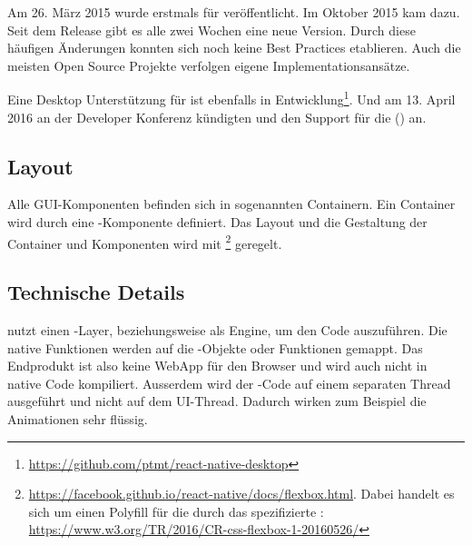Am 26. März 2015 wurde  erstmals für  veröffentlicht.
Im Oktober 2015 kam  dazu.\cite{react-native-release}
Seit dem Release gibt es alle zwei Wochen eine neue Version. 
Durch diese häufigen Änderungen konnten sich noch keine Best Practices etablieren. 
Auch die meisten Open Source Projekte verfolgen eigene Implementationsansätze.

Eine Desktop Unterstützung für  ist ebenfalls in Entwicklung\footnote{\url{https://github.com/ptmt/react-native-desktop}}. 
Und am 13. April 2016 an der  Developer Konferenz kündigten  und  den Support für die  () an.\cite{react-native-windows}


\subsection{Layout}
Alle \gls{GUI}-Komponenten befinden sich in sogenannten Containern. 
Ein Container wird durch eine -Komponente definiert. 
Das Layout und die Gestaltung der Container und Komponenten wird mit \footnote{\url{https://facebook.github.io/react-native/docs/flexbox.html}. Dabei handelt es sich um einen Polyfill für die durch das  spezifizierte : \url{https://www.w3.org/TR/2016/CR-css-flexbox-1-20160526/}} geregelt. 

\subsection{Technische Details}
 nutzt einen -Layer, beziehungsweise  als Engine, um den Code auszuführen.\cite{react-native-javascriptcore} 
Die native Funktionen werden auf die -Objekte oder Funktionen gemappt. 
Das Endprodukt ist also keine \gls{WebApp} für den Browser und wird auch nicht in native Code kompiliert. 
Ausserdem wird der -Code auf einem separaten Thread ausgeführt und nicht auf dem UI-Thread. 
Dadurch wirken zum Beispiel die Animationen sehr flüssig.\cite{react-native-javascript-thread}


